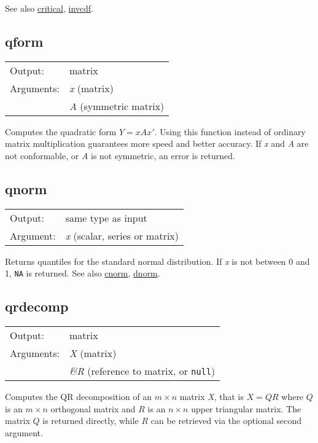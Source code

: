 	  See also \hyperlink{func-critical}{critical}, \hyperlink{func-invcdf}{invcdf}.

\subsection{qform}
\hypertarget{func-qform}{}

\begin{tabular}{ll}
Output:     & matrix\\
Arguments:  & \textsl{x} (matrix)\\
           & \textsl{A} (symmetric matrix)\\
\end{tabular}

	  Computes the quadratic form 
	  $Y = x A x'$. Using this function instead of ordinary
	  matrix multiplication guarantees more speed and better accuracy.
	  If \textsl{x} and \textsl{A} are not
	  conformable, or \textsl{A} is not symmetric, an error
	  is returned.

\subsection{qnorm}
\hypertarget{func-qnorm}{}

\begin{tabular}{ll}
Output:     & same type as input\\
Argument:   & \textsl{x} (scalar, series or matrix)\\
\end{tabular}

	  Returns quantiles for the standard normal distribution. If
	  \textsl{x} is not between 0 and 1, \texttt{NA} is
	  returned. 
	  See also \hyperlink{func-cnorm}{cnorm}, \hyperlink{func-dnorm}{dnorm}.

\subsection{qrdecomp}
\hypertarget{func-qrdecomp}{}

\begin{tabular}{ll}
Output:     & matrix\\
Arguments:  & \textsl{X} (matrix)\\
           & \textsl{\&R} (reference to matrix, or \texttt{null})\\
\end{tabular}

	  Computes the QR decomposition of an \ensuremath{m\times n} matrix
	  \textsl{X}, that is \ensuremath{X = QR} where
	  \ensuremath{Q} is an \ensuremath{m\times n} orthogonal matrix and
	  \ensuremath{R} is an \ensuremath{n\times n} upper triangular matrix. The
	  matrix \ensuremath{Q} is returned directly, while \ensuremath{R} can
	  be retrieved via the optional second argument.


